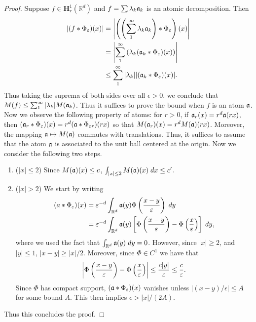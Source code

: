 \documentclass{article}
\begin{document}
\begin{proof}
	Suppose $f \in \mathbf{H}^{1}_{r}(\mathbb{R}^{d})$ and $f = \sum \lambda_{k}\frak{a}_{k}$ is an atomic decomposition. Then 
	\begin{align*}
		\begin{split}
			|(f \ast \Phi_{\epsilon})(x)| &= \abs{\left(\left(\sum_{1}^{\infty}\lambda_{k}\mathfrak{a}_{k}\right) \ast \Phi_{\epsilon}\right)(x)} \\
			&= \abs{\sum_{1}^{\infty}\left(\lambda_{k}(\frak{a}_{k} \ast \Phi_{\epsilon})(x)\right)} \\
			&\leq \sum_{1}^{\infty}|\lambda_{k}||(\frak{a}_{k} \ast \Phi_{\epsilon})(x)|. 
		\end{split} 
	\end{align*} 
	Thus taking the suprema of both sides over all $\epsilon > 0$, we conclude that $M(f) \leq \sum_{1}^{\infty}|\lambda_{k}|M(\frak{a}_{k})$. Thus it suffices to prove the bound when $f$ is an atom $\frak{a}$. Now we observe the following property of atoms: for $r > 0$, if $\frak{a}_{r}(x) = r^{d}\frak{a}(rx)$, then $(\frak{a}_{r}\ast\Phi_{\epsilon})(x) = r^{d}(\frak{a}\ast \Phi_{\epsilon r})(rx)$ so that $M(\frak{a}_{r})(x) = r^{d}M(\frak{a})(rx)$. Moreover, the mapping $\frak{a} \mapsto M(\frak{a})$ commutes with translations. Thus, it suffices to assume that the atom $\frak{a}$ is associated to the unit ball centered at the origin. Now we consider the following two steps. \vspace{-0.25cm}
	\begin{enumerate}
		\item ($|x| \leq 2$) Since $M(\frak{a})(x) \leq c$, $\int_{|x|\leq 2}M(\frak{a})(x)\;dx \leq c'$. 
		\item ($|x| > 2$) We start by writing 
		\begin{align*}
			\begin{split}
				(a \ast \Phi_{\epsilon})(x) &= \epsilon^{-d}\int_{\mathbb{R}^{d}}\frak{a}(y)\Phi\left(\frac{x - y}{\epsilon}\right)\;dy \\
				&= \epsilon^{-d}\int_{\mathbb{R}^{d}}\frak{a}(y)\left[\Phi\left(\frac{x - y}{\epsilon}\right) - \Phi\left(\frac{x}{\epsilon}\right)\right]\;dy, 
			\end{split} 
		\end{align*} 
		where we used the fact that $\int_{\mathbb{R}^{d}}\frak{a}(y)\;dy = 0$. However, since $|x|\geq 2$, and $|y| \leq 1$, $|x - y|\geq |x|/2$. Moreover, since $\Phi \in C^{1}$ we have that 
		\begin{equation*}
			\abs{\Phi\left(\frac{x - y}{\epsilon}\right) - \Phi\left(\frac{x}{\epsilon}\right)} \leq \frac{c|y|}{\epsilon} \leq \frac{c}{\epsilon}. 
		\end{equation*}
		Since $\Phi$ has compact support, $(\frak{a} \ast \Phi_{\epsilon})(x)$ vanishes unless $|(x - y)/\epsilon| \leq A$ for some bound $A$. This then implies $\epsilon > |x|/(2A)$.
	\end{enumerate}
	Thus this concludes the proof. 
\end{proof} 
\end{document}
